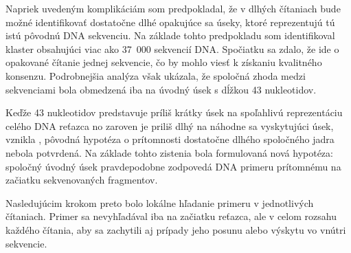 Napriek uvedeným komplikáciám som predpokladal, že v dlhých čítaniach bude možné identifikovať dostatočne dlhé opakujúce sa úseky, ktoré reprezentujú tú istú pôvodnú DNA sekvenciu.
Na základe tohto predpokladu som identifikoval klaster obsahujúci viac ako 37~000 sekvencií DNA.
Spočiatku sa zdalo, že ide o opakované čítanie jednej sekvencie, čo by mohlo viesť k získaniu kvalitného konsenzu.
Podrobnejšia analýza však ukázala, že spoločná zhoda medzi sekvenciami bola obmedzená iba na úvodný úsek s dĺžkou 43 nukleotidov.

Keďže 43 nukleotidov predstavuje príliš krátky úsek na spoľahlivú reprezentáciu celého DNA reťazca no zaroven je priliš dlhý na náhodne sa vyskytujúci úsek, vznikla
, pôvodná hypotéza o prítomnosti dostatočne dlhého spoločného jadra nebola potvrdená.
Na základe tohto zistenia bola formulovaná nová hypotéza: spoločný úvodný úsek pravdepodobne zodpovedá DNA primeru prítomnému na začiatku sekvenovaných fragmentov.

Nasledujúcim krokom preto bolo lokálne hľadanie primeru v jednotlivých čítaniach.
Primer sa nevyhľadával iba na začiatku reťazca, ale v celom rozsahu každého čítania, aby sa zachytili aj prípady jeho posunu alebo výskytu vo vnútri sekvencie.


%